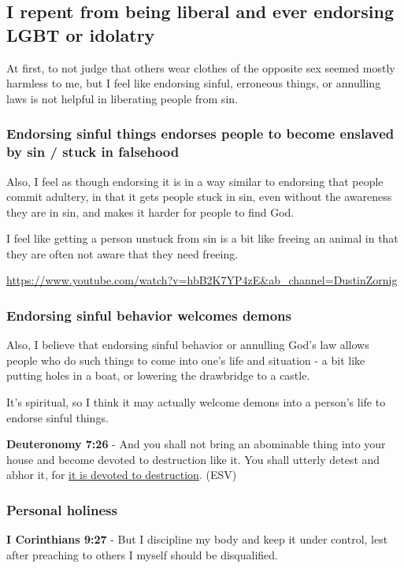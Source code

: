 \documentclass[11pt]{article}
\begin{document}
\subsection{I repent from being liberal and ever endorsing LGBT or idolatry}
\label{sec:org3b671ef}
At first, to not judge that others wear
clothes of the opposite sex seemed mostly
harmless to me, but I feel like endorsing
sinful, erroneous things, or annulling laws
is not helpful in liberating people from sin.

\subsubsection{Endorsing sinful things endorses people to become enslaved by sin / stuck in falsehood}
\label{sec:org2b600c2}
Also, I feel as though endorsing it is in a
way similar to endorsing that people commit
adultery, in that it gets people stuck in sin,
even without the awareness they are in sin,
and makes it harder for people to find God.

I feel like getting a person unstuck from sin
is a bit like freeing an animal in that they
are often not aware that they need freeing.

\url{https://www.youtube.com/watch?v=hbB2K7YP4zE\&ab\_channel=DustinZornig}

\subsubsection{Endorsing sinful behavior welcomes demons}
\label{sec:org00a1a2b}
Also, I believe that endorsing sinful behavior
or annulling God's law allows people who do
such things to come into one's life and
situation - a bit like putting holes in a
boat, or lowering the drawbridge to a castle.

It's spiritual, so I think it may actually
welcome demons into a person's life to endorse
sinful things.

\textbf{Deuteronomy 7:26} - And you shall not bring an abominable thing into your house and become devoted to destruction like it. You shall utterly detest and abhor it, for \uline{it is devoted to destruction}.  (ESV)

\subsubsection{Personal holiness}
\label{sec:org80c0fb0}
\textbf{I Corinthians 9:27} - But I discipline my body and keep it under control, lest after preaching to others I myself should be disqualified.
\end{document}
